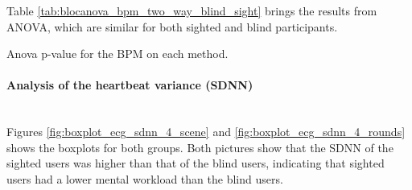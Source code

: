 Table \ref{tab:blocanova_bpm_two_way_blind_sight} brings the results from ANOVA, which are similar for both sighted and blind participants.

\begin{table}[!htb]
    \caption{Anova p-value for the BPM on each method.}
    \label{tab:blocanova_bpm_two_way_blind_sight}
\begin{minipage}{0.45\linewidth}
    
\end{minipage}%
\begin{minipage}{0.05\linewidth}
    \hfill
\end{minipage}%
\begin{minipage}{0.45\linewidth}
    
\end{minipage}
\end{table}



\paragraph*{Analysis of the heartbeat variance (SDNN)}\mbox{}\\

Figures \ref{fig:boxplot_ecg_sdnn_4_scene} and \ref{fig:boxplot_ecg_sdnn_4_rounds} shows the boxplots for both groups. Both pictures show that the SDNN of the sighted users was higher than that of the blind users, indicating that sighted users had a lower mental workload than the blind users.

